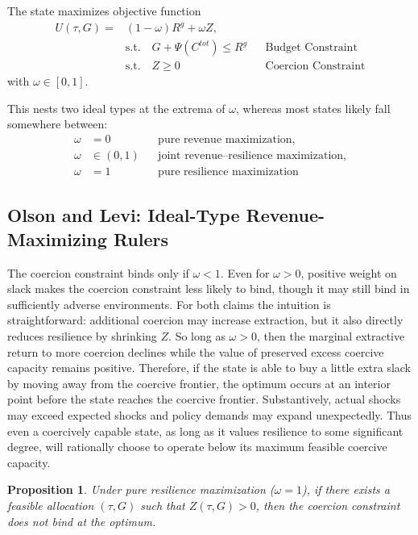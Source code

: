 \documentclass[12pt]{article}
\newtheorem{proposition}{Proposition}
\begin{document}
The state maximizes objective function
\begin{align}
U(\tau,G) =& (1-\omega)R^g + \omega Z, \\
& \text{s.t.} \quad G + \Psi(C^{tot}) \le R^g && \text{Budget Constraint} \\
& \text{s.t.} \quad Z \ge 0 && \text{Coercion Constraint}
\label{eq:jointobj}
\end{align}
with $\omega \in [0,1]$.

This nests two ideal types at the extrema of $\omega$, whereas most states likely fall somewhere between:
\begin{align*}
\omega &= 0 && \text{pure revenue maximization},\\
\omega &\in (0,1) && \text{joint revenue--resilience maximization}, \\
\omega &= 1 && \text{pure resilience maximization}
\end{align*}

\subsection{Olson and Levi: Ideal-Type Revenue-Maximizing Rulers}

The coercion constraint binds only if $\omega<1$. Even for $\omega>0$, positive weight on slack makes the coercion constraint less likely to bind, though it may still bind in sufficiently adverse environments. For both claims the intuition is straightforward: additional coercion may increase extraction, but it also directly reduces resilience by shrinking $Z$. So long as $\omega > 0$, then the marginal extractive return to more coercion declines while the value of preserved excess coercive capacity remains positive. Therefore, if the state is able to buy a little extra slack by moving away from the coercive frontier, the optimum occurs at an interior point before the state reaches the coercive frontier. Substantively, actual shocks may exceed expected shocks and policy demands may expand unexpectedly. Thus even a coercively capable state, as long as it values resilience to some significant degree, will rationally choose to operate below its maximum feasible coercive capacity.

\begin{proposition}\label{prop:bindsonlyomega1}
Under pure resilience maximization (\(\omega = 1\)), if there exists a feasible allocation \((\tau,G)\) such that \(Z(\tau,G)>0\), then the coercion constraint does not bind at the optimum.
\end{proposition}
\end{document}

